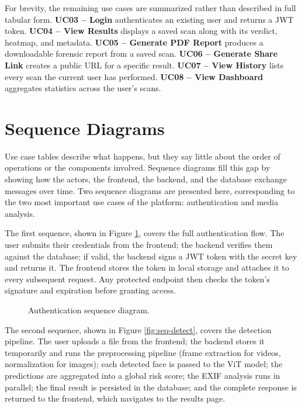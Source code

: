 For brevity, the remaining use cases are summarized rather than described in full tabular form. \textbf{UC03 -- Login} authenticates an existing user and returns a JWT token. \textbf{UC04 -- View Results} displays a saved scan along with its verdict, heatmap, and metadata. \textbf{UC05 -- Generate PDF Report} produces a downloadable forensic report from a saved scan. \textbf{UC06 -- Generate Share Link} creates a public URL for a specific result. \textbf{UC07 -- View History} lists every scan the current user has performed. \textbf{UC08 -- View Dashboard} aggregates statistics across the user's scans.

\section{Sequence Diagrams}

Use case tables describe what happens, but they say little about the order of operations or the components involved. Sequence diagrams fill this gap by showing how the actors, the frontend, the backend, and the database exchange messages over time. Two sequence diagrams are presented here, corresponding to the two most important use cases of the platform: authentication and media analysis.

The first sequence, shown in Figure \ref{fig:seq-auth}, covers the full authentication flow. The user submits their credentials from the frontend; the backend verifies them against the database; if valid, the backend signs a JWT token with the secret key and returns it. The frontend stores the token in local storage and attaches it to every subsequent request. Any protected endpoint then checks the token's signature and expiration before granting access.

\begin{figure}[H]
\centering
{}
\caption{Authentication sequence diagram.}
\label{fig:seq-auth}
\end{figure}

The second sequence, shown in Figure \ref{fig:seq-detect}, covers the detection pipeline. The user uploads a file from the frontend; the backend stores it temporarily and runs the preprocessing pipeline (frame extraction for videos, normalization for images); each detected face is passed to the ViT model; the predictions are aggregated into a global risk score; the EXIF analysis runs in parallel; the final result is persisted in the database; and the complete response is returned to the frontend, which navigates to the results page.

